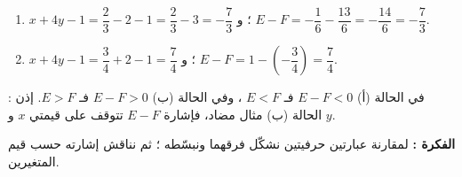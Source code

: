 \documentclass[12pt,a4paper]{article}
\begin{document}
\begin{corr}[title={قيمة عبارة والمقارنة}, stars=3, source={Axiomaths}]
\begin{enumerate}[itemsep=14pt]
\begin{enumerate}
    \item $x+4y-1=\dfrac{2}{3}-2-1=\dfrac{2}{3}-3=-\dfrac{7}{3}$ ؛ و $E-F=-\dfrac{1}{6}-\dfrac{13}{6}=-\dfrac{14}{6}=-\dfrac{7}{3}$. \checkmark
    \item $x+4y-1=\dfrac{3}{4}+2-1=\dfrac{7}{4}$ ؛ و $E-F=1-\left(-\dfrac{3}{4}\right)=\dfrac{7}{4}$. \checkmark
  \end{enumerate}
  في الحالة (أ) $E-F<0$ فـ $E<F$ ، وفي الحالة (ب) $E-F>0$ فـ $E>F$. إذن  : الحالة (ب) مثال مضاد، فإشارة $E-F$ تتوقف على قيمتي $x$ و $y$.
\end{enumerate}
\textbf{الفكرة :} لمقارنة عبارتين حرفيتين نشكّل فرقهما ونبسّطه ؛ ثم نناقش إشارته حسب قيم المتغيرين.
\end{corr}
\end{document}

